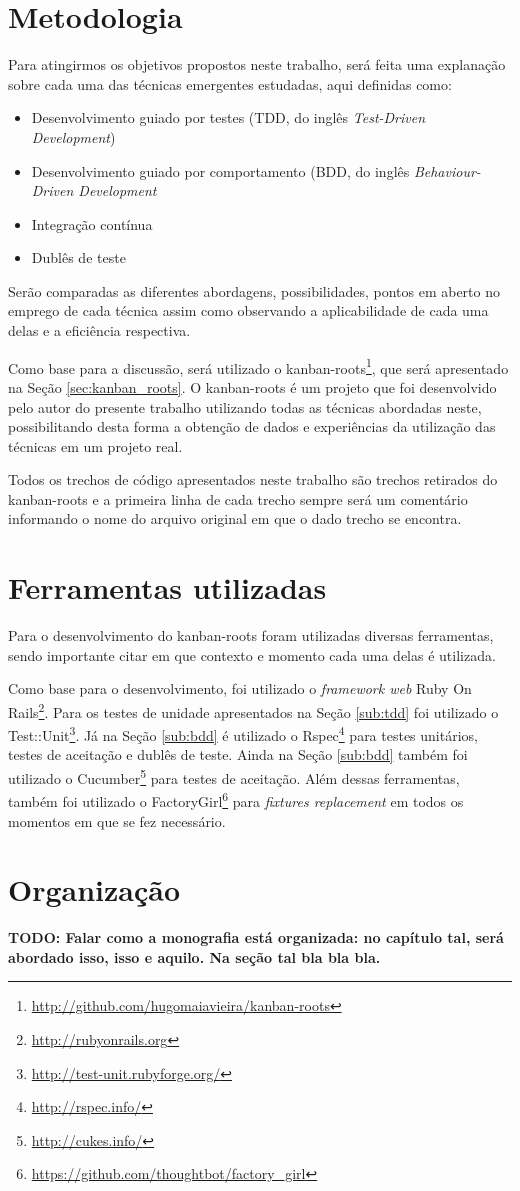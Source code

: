\section{Metodologia}

Para atingirmos os objetivos propostos neste trabalho, será feita uma explanação sobre cada uma das técnicas emergentes estudadas, aqui definidas como:

\begin{itemize}
  \item Desenvolvimento guiado por testes (TDD, do inglês \textit{Test-Driven Development})
  \item Desenvolvimento guiado por comportamento (BDD, do inglês \textit{Behaviour-Driven Development}
  \item Integração contínua
  \item Dublês de teste
\end{itemize}

Serão comparadas as diferentes abordagens, possibilidades, pontos em aberto no emprego de cada técnica assim como observando a aplicabilidade de cada uma delas e a eficiência respectiva.

Como base para a discussão, será utilizado o kanban-roots\footnote{\url{http://github.com/hugomaiavieira/kanban-roots}}, que será apresentado na Seção \ref{sec:kanban_roots}. O kanban-roots é um projeto que foi desenvolvido pelo autor do presente trabalho utilizando todas as técnicas abordadas neste, possibilitando desta forma a obtenção de dados e experiências da utilização das técnicas em um projeto real.

Todos os trechos de código apresentados neste trabalho são trechos retirados do kanban-roots e a primeira linha de cada trecho sempre será um comentário informando o nome do arquivo original em que o dado trecho se encontra.

\section{Ferramentas utilizadas}

Para o desenvolvimento do kanban-roots foram utilizadas diversas ferramentas, sendo importante citar em que contexto e momento cada uma delas é utilizada.

Como base para o desenvolvimento, foi utilizado o \textit{framework web} Ruby On Rails\footnote{\url{http://rubyonrails.org}}. Para os testes de unidade apresentados na Seção \ref{sub:tdd} foi utilizado o Test::Unit\footnote{\url{http://test-unit.rubyforge.org/}}. Já na Seção \ref{sub:bdd} é utilizado o Rspec\footnote{\url{http://rspec.info/}} para testes unitários, testes de aceitação e dublês de teste. Ainda na Seção \ref{sub:bdd} também foi utilizado o Cucumber\footnote{\url{http://cukes.info/}} para testes de aceitação. Além dessas ferramentas, também foi utilizado o FactoryGirl\footnote{\url{https://github.com/thoughtbot/factory_girl}} para \textit{fixtures replacement} em todos os momentos em que se fez necessário.

\section{Organização}
\label{sec:organizacao}

\textbf{TODO: Falar como a monografia está organizada: no capítulo tal, será abordado isso, isso e aquilo. Na seção tal bla bla bla.}